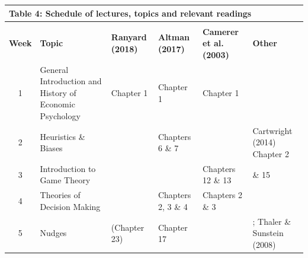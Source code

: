 \documentclass[
  x11names]{article}
\begin{document}
\begin{table}[h!]
  \begin{center}
    \begin{tabular}{| c | >{\arraybackslash}m{5cm} | >{\centering\arraybackslash}m{1.75cm} | >{\centering\arraybackslash}m{1.75cm} | >{\centering\arraybackslash}m{1.75cm} | >{\centering\arraybackslash}m{3cm} | }
    \multicolumn{6}{l}{\textbf{Table 4:} Schedule of lectures, topics and relevant readings} \\
    \hline
    & & \multicolumn{4}{c|}{\textbf{Readings}} \\ \hline
    \textbf{Week} & \textbf{Topic} &                      \textbf{Ranyard (2018)} & \textbf{Altman (2017)} & \textbf{Camerer et al. (2003)} & \textbf{Other}  \\ \hline
      1   & General Introduction and History of Economic Psychology & Chapter 1    & Chapter 1          & Chapter 1           &  \href{https://learn.ul.ie//content/enforced/92897-PS4168_SEM1_2026_7/1.Resources/Cartwright_2014_Chapter1.pdf}{\color{blue}{Cartwright (2014) Chapter 1}\color{black}} \\ \hline
      2   & Heuristics \& Biases                                    & \href{https://learn.ul.ie//content/enforced/92897-PS4168_SEM1_2026_7/1.Resources/Ranyard_2018_Chapter2.pdf}{\color{blue}{Chapter 2}\color{black}}    & Chapters 6 \& 7    &                     & Cartwright (2014) Chapter 2     \\ \hline
       3   & Introduction to Game Theory            &              & \href{https://learn.ul.ie//content/enforced/92897-PS4168_SEM1_2026_7/1.Resources/Altman_2017_Chapter32.pdf}{\color{blue}{Chapter 32}\color{black}}         & Chapters 12 \& 13   & \href{https://learn.ul.ie//content/enforced/92897-PS4168_SEM1_2026_7/1.Resources/Antonides_1996_Chapter14.pdf}{\color{blue}{Antonides, (1996) Chapters 14}\color{black}}   \& 15 \\ \hline
      4   & Theories of Decision Making                  & \href{https://learn.ul.ie//content/enforced/92897-PS4168_SEM1_2026_7/1.Resources/Ranyard_2018_Chapter2.pdf}{\color{blue}{Chapter 2}\color{black}}    & Chapters 2, 3 \& 4 & Chapters 2 \& 3     &                                 \\ \hline
      5   & Nudges                                                   & (Chapter 23) & Chapter 17         &                     & \href{https://learn.ul.ie//content/enforced/92897-PS4168_SEM1_2026_7/1.Resources/Frantz_2016_Chapter8.pdf}{\color{blue}{Frantz et al., (2016) Chapter 8}\color{black}}; Thaler \& Sunstein (2008) \\ \hline

\end{tabular}
\end{center}
\end{table}
\end{document}
